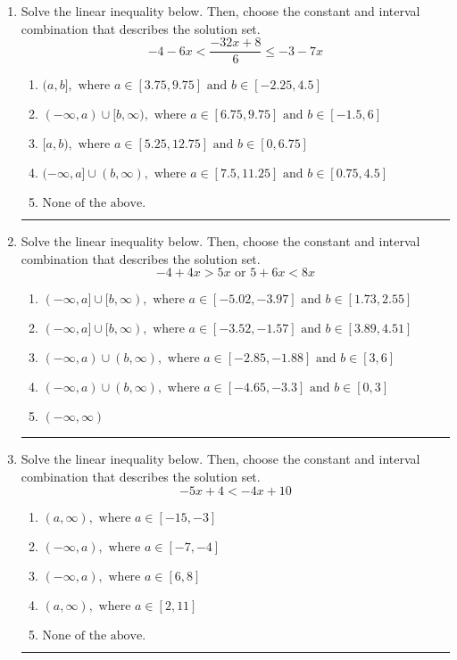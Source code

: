 \documentclass[14pt]{extbook}
\newcommand{\litem}[1]{\item#1\hspace*{-1cm}\rule{\textwidth}{0.4pt}}
\begin{document}
\begin{enumerate}
{\begin{enumerate}[label=\Alph*.]
\end{enumerate} }
\litem{
Solve the linear inequality below. Then, choose the constant and interval combination that describes the solution set.\[ -4 - 6 x < \frac{-32 x + 8}{6} \leq -3 - 7 x \]\begin{enumerate}[label=\Alph*.]
\item \( (a, b], \text{ where } a \in [3.75, 9.75] \text{ and } b \in [-2.25, 4.5] \)
\item \( (-\infty, a) \cup [b, \infty), \text{ where } a \in [6.75, 9.75] \text{ and } b \in [-1.5, 6] \)
\item \( [a, b), \text{ where } a \in [5.25, 12.75] \text{ and } b \in [0, 6.75] \)
\item \( (-\infty, a] \cup (b, \infty), \text{ where } a \in [7.5, 11.25] \text{ and } b \in [0.75, 4.5] \)
\item \( \text{None of the above.} \)

\end{enumerate} }
\litem{
Solve the linear inequality below. Then, choose the constant and interval combination that describes the solution set.\[ -4 + 4 x > 5 x \text{ or } 5 + 6 x < 8 x \]\begin{enumerate}[label=\Alph*.]
\item \( (-\infty, a] \cup [b, \infty), \text{ where } a \in [-5.02, -3.97] \text{ and } b \in [1.73, 2.55] \)
\item \( (-\infty, a] \cup [b, \infty), \text{ where } a \in [-3.52, -1.57] \text{ and } b \in [3.89, 4.51] \)
\item \( (-\infty, a) \cup (b, \infty), \text{ where } a \in [-2.85, -1.88] \text{ and } b \in [3, 6] \)
\item \( (-\infty, a) \cup (b, \infty), \text{ where } a \in [-4.65, -3.3] \text{ and } b \in [0, 3] \)
\item \( (-\infty, \infty) \)

\end{enumerate} }
\litem{
Solve the linear inequality below. Then, choose the constant and interval combination that describes the solution set.\[ -5x + 4 < -4x + 10 \]\begin{enumerate}[label=\Alph*.]
\item \( (a, \infty), \text{ where } a \in [-15, -3] \)
\item \( (-\infty, a), \text{ where } a \in [-7, -4] \)
\item \( (-\infty, a), \text{ where } a \in [6, 8] \)
\item \( (a, \infty), \text{ where } a \in [2, 11] \)
\item \( \text{None of the above}. \)


\end{enumerate}}
\end{enumerate}
\end{document}
